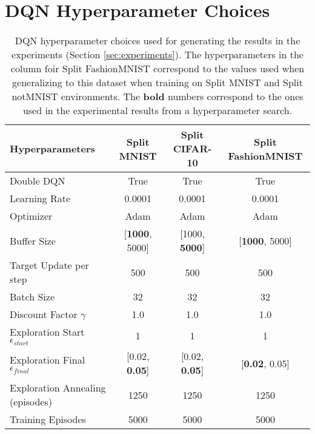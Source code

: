 
\section{DQN Hyperparameter Choices}\label{app:dqn_hyperparameter_choices}

\begin{table}[t]
\centering
\caption{DQN hyperparameter choices used for generating the results in the experiments (Section \ref{sec:experiments}). The hyperparameters in the column foir Split FashionMNIST correspond to the values used when generalizing to this dataset when training on Split MNIST and Split notMNIST environments. The {\bf bold} numbers correspond to the ones used in the experimental results from a hyperparameter search.  }
\label{tab:dqn_hyperparameter_choices}
\begin{tabular}{l c c c}
\toprule
 {\bf Hyperparameters} & {\bf Split MNIST} & {\bf Split CIFAR-10} & {\bf Split FashionMNIST}\\
 \midrule
 Double DQN     & True & True & True\\
 Learning Rate  & 0.0001 & 0.0001 & 0.0001 \\
 Optimizer      & Adam & Adam & Adam \\
 Buffer Size    & [{\bf 1000}, 5000] & [1000, {\bf 5000}] & [{\bf 1000}, 5000]  \\
 Target Update per step  & 500 & 500 & 500 \\
 Batch Size     & 32 & 32 & 32 \\
 Discount Factor $\gamma$ & 1.0 & 1.0 & 1.0 \\
 Exploration Start $\epsilon_{start}$ & 1 & 1 & 1 \\
 Exploration Final $\epsilon_{final}$ & [0.02, {\bf 0.05}] & [0.02, {\bf 0.05}] & [{\bf 0.02}, 0.05] \\
 Exploration Annealing (episodes) & 1250 & 1250 & 1250 \\
 Training Episodes & 5000 & 5000 & 5000 \\
\bottomrule
\end{tabular}
\end{table}



